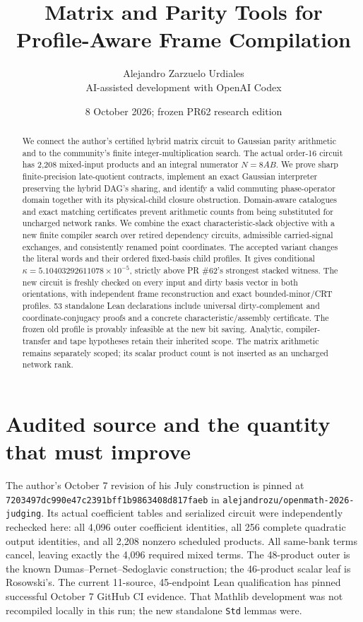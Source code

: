 \documentclass[11pt]{article}
\title{Matrix and Parity Tools for\\Profile-Aware Frame Compilation}
\author{Alejandro Zarzuelo Urdiales\\\small AI-assisted development with OpenAI Codex}
\date{8 October 2026; frozen PR62 research edition}
\begin{document}
\maketitle
\begin{abstract}
We connect the author's certified hybrid matrix circuit to Gaussian parity
arithmetic and to the community's finite integer-multiplication search.
The actual order-16 circuit has 2,208 mixed-input products and an integral
numerator $N=8AB$. We prove sharp finite-precision late-quotient contracts,
implement an exact Gaussian interpreter preserving the hybrid DAG's sharing,
and identify a valid commuting phase-operator domain together with its
physical-child closure obstruction. Domain-aware catalogues and exact
matching certificates prevent arithmetic counts from being substituted for
uncharged network ranks. We combine the exact characteristic-slack objective with a new finite compiler
search over retired dependency circuits, admissible carried-signal exchanges,
and consistently renamed point coordinates. The accepted variant changes the
literal words and their ordered fixed-basis child profiles. It gives conditional
$\kappa=5.10403292611078\times10^{-5}$, strictly above PR \#62's strongest stacked
witness. The new circuit is freshly checked on every input and dirty basis
vector in both orientations, with independent frame reconstruction and exact
bounded-minor/CRT profiles. 53 standalone Lean declarations include
universal dirty-complement and coordinate-conjugacy proofs and a concrete
characteristic/assembly certificate. The frozen old profile is provably
infeasible at the new bit saving. Analytic, compiler-transfer and tape hypotheses
retain their inherited scope. The matrix arithmetic remains separately scoped;
its scalar product count is not inserted as an uncharged network rank.
\end{abstract}

\section{Audited source and the quantity that must improve}
The author's October 7 revision of his July construction is pinned at
\texttt{7203497dc990e47c2391bff1b9863408d817faeb} in
\texttt{alejandrozu/openmath-2026-judging}. Its actual coefficient tables and
serialized circuit were independently rechecked here: all 4,096 outer
coefficient identities, all 256 complete quadratic output identities, and
all 2,208 nonzero scheduled products. All same-bank terms cancel, leaving
exactly the 4,096 required mixed terms. The 48-product outer is the known
Dumas--Pernet--Sedoglavic construction; the 46-product scalar leaf is Rosowski's.
The current 11-source, 45-endpoint Lean qualification has pinned successful
October 7 GitHub CI evidence. That Mathlib development was not recompiled
locally in this run; the new standalone \texttt{Std} lemmas were.
\end{document}
